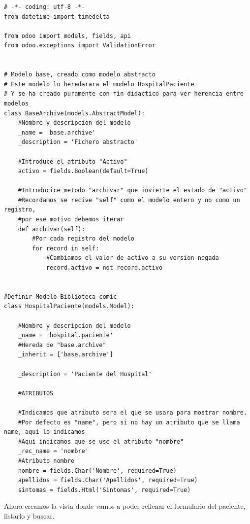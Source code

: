 \documentclass[a4paper,12pt]{article}
\begin{document}
\vspace{1.5cm}
\begin{lstlisting}[style=javascript]
# -*- coding: utf-8 -*-
from datetime import timedelta

from odoo import models, fields, api
from odoo.exceptions import ValidationError


# Modelo base, creado como modelo abstracto 
# Este modelo lo heredarara el modelo HospitalPaciente
# Y se ha creado puramente con fin didactico para ver herencia entre modelos
class BaseArchive(models.AbstractModel):
    #Nombre y descripcion del modelo
    _name = 'base.archive'
    _description = 'Fichero abstracto'

    #Introduce el atributo "Activo"
    activo = fields.Boolean(default=True)

    #Introducice metodo "archivar" que invierte el estado de "activo"
    #Recordamos se recive "self" como el modelo entero y no como un registro,
    #por ese motivo debemos iterar
    def archivar(self):
        #Por cada registro del modelo
        for record in self:
            #Cambiamos el valor de activo a su version negada
            record.activo = not record.activo


#Definir Modelo Biblioteca comic
class HospitalPaciente(models.Model):

    #Nombre y descripcion del modelo
    _name = 'hospital.paciente'
    #Hereda de "base.archive"
    _inherit = ['base.archive']

    _description = 'Paciente del Hospital'

    #ATRIBUTOS
    
    #Indicamos que atributo sera el que se usara para mostrar nombre.
    #Por defecto es "name", pero si no hay un atributo que se llama name, aqui lo indicamos
    #Aqui indicamos que se use el atributo "nombre"
    _rec_name = 'nombre'
    #Atributo nombre
    nombre = fields.Char('Nombre', required=True)
    apellidos = fields.Char('Apellidos', required=True)
    sintomas = fields.Html('Sintomas', required=True)
\end{lstlisting}

Ahora creamos la vista donde vamos a poder rellenar el formulario del paciente, listarlo y buscar. 
\end{document}
